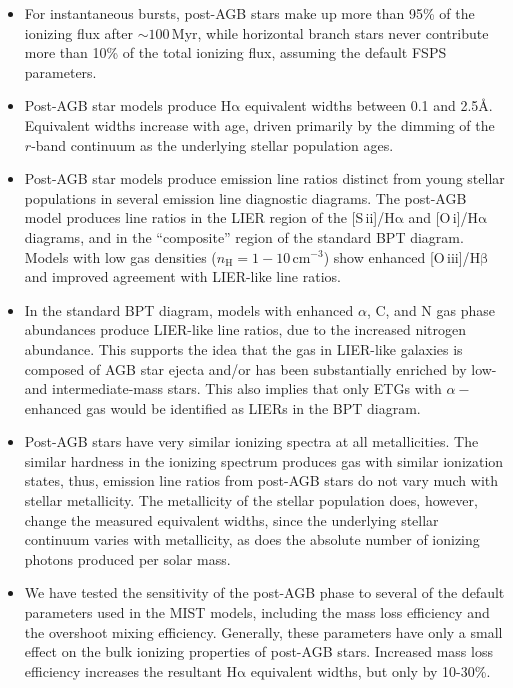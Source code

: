 \documentclass[preprint2]{aastex62}
\newcommand{\FSPS}{{\sc FSPS}\xspace}
\newcommand{\sii}{[S\,{\sc ii}]\xspace}
\newcommand{\oiii}{[O\,{\sc iii}]\xspace}
\newcommand{\oi}{[O\,{\sc i}]\xspace}
\newcommand{\ha}{\ensuremath{\mathrm{H\alpha}}\xspace}
\newcommand{\hb}{\ensuremath{\mathrm{H\beta}}\xspace}
\newcommand{\ang}{\ensuremath{\mbox{\AA}}\xspace}
\newcommand{\Myr}{$\,$Myr\xspace}
\begin{document}
\begin{itemize}
    \item For instantaneous bursts, post-AGB stars make up more than 95\% of the ionizing flux after ${\sim}100$\Myr, while horizontal branch stars never contribute more than 10\% of the total ionizing flux, assuming the default \FSPS parameters.
    \item Post-AGB star models produce \ha equivalent widths between 0.1 and 2.5\ang. Equivalent widths increase with age, driven primarily by the dimming of the $r$-band continuum as the underlying stellar population ages.
    \item Post-AGB star models produce emission line ratios distinct from young stellar populations in several emission line diagnostic diagrams. The post-AGB model produces line ratios in the LIER region of the \sii/\ha and \oi/\ha diagrams, and in the ``composite'' region of the standard BPT diagram. Models with low gas densities ($n_{\mathrm{H}} = 1-10$\,cm$^{-3}$) show enhanced \oiii/\hb and improved agreement with LIER-like line ratios.
    \item In the standard BPT diagram, models with enhanced $\alpha$, C, and N gas phase abundances produce LIER-like line ratios, due to the increased nitrogen abundance. This supports the idea that the gas in LIER-like galaxies is composed of AGB star ejecta and/or has been substantially enriched by low- and intermediate-mass stars. This also implies that only ETGs with $\alpha-$enhanced gas would be identified as LIERs in the BPT diagram.
    \item Post-AGB stars have very similar ionizing spectra at all metallicities. The similar hardness in the ionizing spectrum produces gas with similar ionization states, thus, emission line ratios from post-AGB stars do not vary much with stellar metallicity. The metallicity of the stellar population does, however, change the measured equivalent widths, since the underlying stellar continuum varies with metallicity, as does the absolute number of ionizing photons produced per solar mass.
    \item We have tested the sensitivity of the post-AGB phase to several of the default parameters used in the MIST models, including the mass loss efficiency and the overshoot mixing efficiency. Generally, these parameters have only a small effect on the bulk ionizing properties of post-AGB stars. Increased mass loss efficiency increases the resultant \ha equivalent widths, but only by 10-30\%.
\end{itemize}
\end{document}
